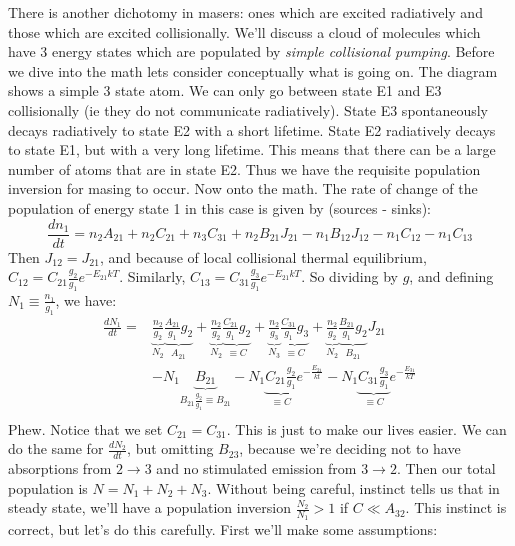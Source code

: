 \documentclass{article}
\def\ato{{A_{21}}}
\def\bto{{B_{21}}}
\def\bot{{B_{12}}}
\def\ato{{A_{21}}}
\def\bto{{B_{21}}}
\def\bot{{B_{12}}}
\def\ato{{A_{21}}}
\def\bto{{B_{21}}}
\def\bot{{B_{12}}}
\begin{document}
There is another dichotomy in masers: ones which are excited radiatively and
those which are excited collisionally.  We'll discuss a cloud of molecules
which have 3 energy states which are populated by {\it simple collisional
pumping}. Before we dive into the math lets consider conceptually what is going on.
The diagram shows a simple 3 state atom. We can only go between state E1 and E3 collisionally (ie they do not communicate radiatively).
State E3 spontaneously decays radiatively to state E2 with a short lifetime. State E2 radiatively decays to state E1, but with a very long lifetime.
This means that there can be a large number of atoms that are in state E2. Thus we have the requisite population inversion for masing to occur.
Now onto the math.
  The rate of change of the population of energy state
1 in this case is given by (sources - sinks):
$$\frac{dn_1}{ dt}=n_2\ato+n_2C_{21}+n_3C_{31}+n_2\bto J_{21}-n_1\bot J_{12}
-n_1C_{12}-n_1C_{13}$$
Then $J_{12}=J_{21}$, and because of local collisional thermal equilibrium,
$C_{12}=C_{21}\frac{g_2}{ g_1}e^{-{E_{21}}{ kT}}$.  Similarly,
$C_{13}=C_{31}\frac{g_3}{ g_1}e^{-{E_{21}}{ kT}}$.  So dividing by $g$, and
defining $N_1\equiv\frac{n_1}{ g_1}$, we have:
$$\begin{aligned}\frac{dN_1}{ dt}=&\underbrace{\frac{n_2}{ g_2}}_{N_2}\underbrace{
\frac{\ato}{ g_1}g_2}_{\ato}+\underbrace{\frac{n_2}{ g_2}}_{N_2}\underbrace{
\frac{C_{21}}{ g_1}g_2}_{\equiv C}+\underbrace{\frac{n_2}{ g_3}}_{N_3}\underbrace{
\frac{C_{31}}{ g_1}g_3}_{\equiv C}+\underbrace{\frac{n_2}{ g_2}}_{N_2}\underbrace{
\frac{\bto}{ g_1}g_2}_{\bto}J_{21}\\
&-N_1\underbrace{\bto}_{\bto\frac{g_2}{ g_1}\equiv
\bto}-N_1\underbrace{C_{21}\frac{g_2}{ g_1}}_{\equiv C}e^{-\frac{E_{21}}{ kt}}-
N_1\underbrace{C_{31}\frac{g_3}{ g_1}}_{\equiv C}e^{-\frac{E_{31}}{ kT}}\\
\end{aligned}$$
Phew.  Notice that we set $C_{21}=C_{31}$.  This is just to make our lives
easier.  We can do the same for $\frac{dN_2}{ dt}$, but omitting $B_{23}$, because
we're deciding not to have absorptions from $2\to3$ and no stimulated emission
from $3\to2$.  Then our total population is $N=N_1+N_2+N_3$.  Without being
careful, instinct tells us that in steady state, we'll have a population
inversion $\frac{N_2}{ N_1}>1$ if $C\ll A_{32}$.  This
instinct is correct, but let's do this carefully.  First we'll make some
assumptions:
\end{document}
